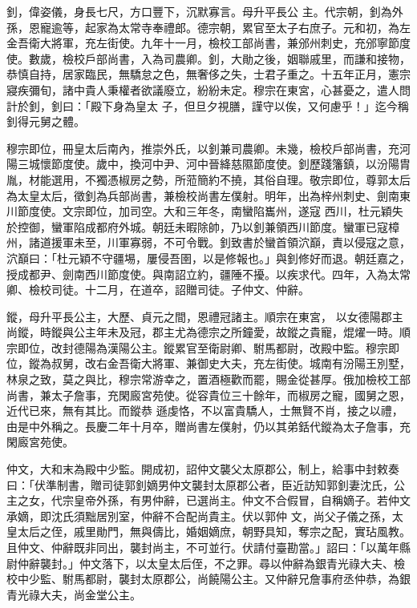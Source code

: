 \begin{pinyinscope}
 釗，偉姿儀，身長七尺，方口豐下，沉默寡言。母升平長公
 主。代宗朝，釗為外孫，恩寵逾等，起家為太常寺奉禮郎。德宗朝，累官至太子右庶子。元和初，為左金吾衛大將軍，充左街使。九年十一月，檢校工部尚書，兼邠州刺史，充邠寧節度使。數歲，檢校戶部尚書，入為司農卿。釗，大勛之後，姻聯戚里，而謙和接物，恭慎自持，居家臨民，無驕怠之色，無奢侈之失，士君子重之。十五年正月，憲宗寢疾彌旬，諸中貴人秉權者欲議廢立，紛紛未定。穆宗在東宮，心甚憂之，遣人問計於釗，釗曰：「殿下身為皇太
 子，但旦夕視膳，謹守以俟，又何慮乎！」迄今稱釗得元舅之體。



 穆宗即位，冊皇太后南內，推崇外氏，以釗兼司農卿。未幾，檢校戶部尚書，充河陽三城懷節度使。歲中，換河中尹、河中晉絳慈隰節度使。釗歷踐籓鎮，以汾陽胄胤，材能選用，不獨憑椒房之勢，所蒞簡約不撓，其俗自理。敬宗即位，尊郭太后為太皇太后，徵釗為兵部尚書，兼檢校尚書左僕射。明年，出為梓州刺史、劍南東川節度使。文宗即位，加司空。大和三年冬，南蠻陷巂州，遂寇
 西川，杜元穎失於控御，蠻軍陷成都府外城。朝廷未暇除帥，乃以釗兼領西川節度。蠻軍已寇樟州，諸道援軍未至，川軍寡弱，不可令戰。釗致書於蠻首領泬巔，責以侵寇之意，泬巔曰：「杜元穎不守疆埸，屢侵吾圉，以是修報也。」與釗修好而退。朝廷嘉之，授成都尹、劍南西川節度使。與南詔立約，疆陲不擾。以疾求代。四年，入為太常卿、檢校司徒。十二月，在道卒，詔贈司徒。子仲文、仲辭。



 鏦，母升平長公主，大歷、貞元之間，恩禮冠諸主。順宗在東宮，
 以女德陽郡主尚鏦，時鏦與公主年未及冠，郡主尤為德宗之所鐘愛，故鏦之貴寵，焜燿一時。順宗即位，改封德陽為漢陽公主。鏦累官至衛尉卿、駙馬都尉，改殿中監。穆宗即位，鏦為叔舅，改右金吾衛大將軍、兼御史大夫，充左街使。城南有汾陽王別墅，林泉之致，莫之與比，穆宗常游幸之，置酒極歡而罷，賜金從甚厚。俄加檢校工部尚書，兼太子詹事，充閑廄宮苑使。從容貴位三十餘年，而椒房之寵，國舅之恩，近代已來，無有其比。而鏦恭
 遜虔恪，不以富貴驕人，士無賢不肖，接之以禮，由是中外稱之。長慶二年十月卒，贈尚書左僕射，仍以其弟銛代鏦為太子詹事，充閑廄宮苑使。



 仲文，大和末為殿中少監。開成初，詔仲文襲父太原郡公，制上，給事中封敕奏曰：「伏準制書，贈司徒郭釗嫡男仲文襲封太原郡公者，臣近訪知郭釗妻沈氏，公主之女，代宗皇帝外孫，有男仲辭，已選尚主。仲文不合假冒，自稱嫡子。若仲文承嫡，即沈氏須黜居別室，仲辭不合配尚貴主。伏以郭仲
 文，尚父子儀之孫，太皇太后之侄，戚里勛門，無與儔比，婚姻嫡庶，朝野具知，奪宗之配，實玷風教。且仲文、仲辭既非同出，襲封尚主，不可並行。伏請付臺勘當。」詔曰：「以萬年縣尉仲辭襲封。」仲文落下，以太皇太后侄，不之罪。尋以仲辭為銀青光祿大夫、檢校中少監、駙馬都尉，襲封太原郡公，尚饒陽公主。又仲辭兄詹事府丞仲恭，為銀青光祿大夫，尚金堂公主。




\end{pinyinscope}
